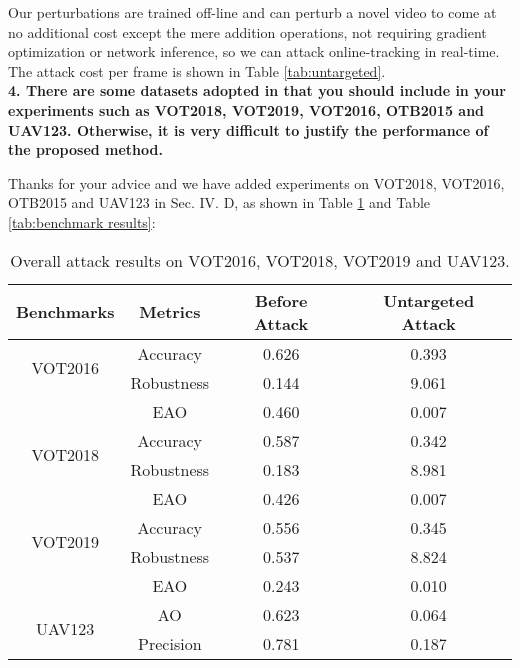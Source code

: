 \documentclass{article}
\begin{document}
Our perturbations are trained off-line and can perturb a novel video to come at no additional cost except the mere addition operations, not requiring gradient optimization or network inference, so we can attack online-tracking in real-time. The attack cost per frame is shown in Table \ref{tab:untargeted}.
\\[6pt]
\noindent \textbf{4. There are some datasets adopted in \cite{SPARK,RTAA} that you should include in your experiments such as VOT2018, VOT2019, VOT2016, OTB2015 and UAV123. Otherwise, it is very difficult to justify the performance of the proposed method.}

Thanks for your advice and we have added experiments on VOT2018, VOT2016, OTB2015 and UAV123 in Sec. IV. D, as shown in Table \ref{tab:benchmark results1} and Table \ref{tab:benchmark results}:

\begin{table}[h]
    \centering
    \caption{Overall attack results on VOT2016, VOT2018, VOT2019 and UAV123.}
    \begin{tabular}{c c | c | c}
    \toprule
    Benchmarks & Metrics & Before Attack    & Untargeted Attack  \\
    \midrule
    \multirow{2}{*}[-6pt]{VOT2016} 
    & Accuracy   & 0.626 & 0.393\\
    & Robustness & 0.144 & 9.061\\
    & EAO        & 0.460 & 0.007\\
    \midrule
    \multirow{2}{*}[-6pt]{VOT2018} 
    & Accuracy   & 0.587 & 0.342\\
    & Robustness & 0.183 & 8.981\\
    & EAO        & 0.426 & 0.007\\
    \midrule
    \multirow{2}{*}[-6pt]{VOT2019} 
    & Accuracy   & 0.556 & 0.345\\
    & Robustness & 0.537 & 8.824\\
    & EAO        & 0.243 & 0.010\\
    \midrule
    \multirow{3}{*}[+6pt]{UAV123} 
    & AO  & 0.623 & 0.064\\
    & Precision & 0.781 & 0.187\\
    \bottomrule
    \end{tabular}
    \label{tab:benchmark results1}
\end{table}
\end{document}
